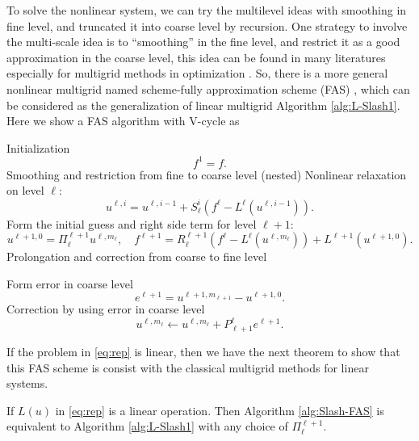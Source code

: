  
To solve the nonlinear system, we can try the multilevel ideas 
with smoothing in fine level, and truncated it into coarse level by recursion. 
One strategy to involve the multi-scale idea is to ``smoothing'' in the fine level, 
and restrict it as a good approximation in the coarse level, this idea can 
be found in many literatures especially for multigrid methods in optimization 
\cite{tai2002global, nash2000a}.  So, there is a more general nonlinear multigrid named 
scheme-fully approximation scheme (FAS) \cite{briggs2000a, trottenberg2000multigrid}, 
which can be considered as the generalization of linear multigrid Algorithm \ref{alg:L-Slash1}.  
Here we show a FAS algorithm with V-cycle as
\begin{breakablealgorithm}
	\caption{$u = {\text{ Bslash-FAS}}(u^{1,0},f,J,m_1, \cdots, m_J)$}
	\label{alg:Slash-FAS}
	\begin{algorithmic}
		\State Initialization 
		$$
		f^1 = f.
		$$
		\State Smoothing and restriction from fine to coarse level (nested)
		\State Nonlinear relaxation on level $\ell$:
		\State 
		$$
		u^{\ell,i} = u^{\ell,i-1} +S_\ell^i(f^\ell - L^{\ell}(u^{\ell,i-1})).
		$$
		\EndFor
		\State Form the initial guess and right side term for level $\ell+1$:
		$$
		u^{\ell+1,0} = \Pi_\ell^{\ell+1}u^{\ell,m_\ell}, \quad 
		f^{\ell+1} = R_\ell^{\ell+1} (f^\ell - L^{\ell}(u^{\ell,m_\ell})) + L^{\ell+1}( u^{\ell+1, 0}).
		$$
		\EndFor
		\State Prolongation and correction from coarse to fine level
		
		\State Form error in coarse level 
		$$
		e^{\ell+1} = u^{\ell+1, m_{\ell+1}} - u^{\ell+1,0}.
		$$
		\State Correction by using error in coarse level
		$$
		u^{\ell,m_\ell} \leftarrow u^{\ell,m_\ell} + P_{\ell+1}^{\ell}e^{\ell+1}.
		$$
		\EndFor
	\end{algorithmic}
\end{breakablealgorithm}
If the problem in \eqref{eq:rep} is linear, then we have the next theorem to show that 
this FAS scheme is consist with the classical multigrid methods for linear systems.
\begin{theorem}
	If $L(u)$  in \eqref{eq:rep}  is a linear operation. 
	Then Algorithm \ref{alg:Slash-FAS} is equivalent to Algorithm \ref{alg:L-Slash1} with any choice of $\Pi_\ell^{\ell+1}$.
\end{theorem}



